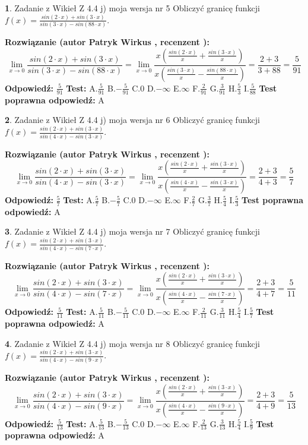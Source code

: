 \documentclass[12pt, a4paper]{article}
\theoremstyle{definition} %
\newtheorem{zad}{}
\newcommand{\zadStart}[1]{\begin{zad}#1\newline}
\newcommand{\zadStop}{\end{zad}}
\newcommand{\rozwStart}[2]{\noindent \textbf{Rozwiązanie (autor #1 , recenzent #2): }\newline}
\newcommand{\rozwStop}{\newline}
\newcommand{\odpStart}{\noindent \textbf{Odpowiedź:}\newline}
\newcommand{\odpStop}{\newline}
\newcommand{\testStart}{\noindent \textbf{Test:}\newline}
\newcommand{\testStop}{\newline}
\newcommand{\kluczStart}{\noindent \textbf{Test poprawna odpowiedź:}\newline}
\newcommand{\kluczStop}{\newline}
\begin{document}
\zadStart{Zadanie z Wikieł Z 4.4 j) moja wersja nr 5}
Obliczyć granicę funkcji $f(x)=\frac{sin(2\cdot x) +sin(3\cdot x)}{sin(3\cdot x) -sin(88\cdot x)}$.
\zadStop
\rozwStart{Patryk Wirkus}{}
$$\lim\limits_{x\to 0}\frac{sin(2\cdot x) +sin(3\cdot x)}{sin(3\cdot x) -sin(88\cdot x)}=\lim\limits_{x\to 0}\frac{x(\frac{sin(2\cdot x)}{x}+\frac{sin(3\cdot x)}{x})}{x(\frac{sin(3\cdot x)}{x}-\frac{sin(88\cdot x)}{x})}=\frac{2+3}{3+88} = \frac{5}{91}$$
\rozwStop
\odpStart
$\frac{5}{91}$
\odpStop
\testStart
A.$\frac{5}{91}$
B.$-\frac{5}{91}$
C.$0$
D.$-\infty$
E.$\infty$
F.$\frac{2}{91}$
G.$\frac{3}{91}$
H.$\frac{5}{3}$
I.$\frac{5}{88}$
\testStop
\kluczStart
A
\kluczStop



\zadStart{Zadanie z Wikieł Z 4.4 j) moja wersja nr 6}
Obliczyć granicę funkcji $f(x)=\frac{sin(2\cdot x) +sin(3\cdot x)}{sin(4\cdot x) -sin(3\cdot x)}$.
\zadStop
\rozwStart{Patryk Wirkus}{}
$$\lim\limits_{x\to 0}\frac{sin(2\cdot x) +sin(3\cdot x)}{sin(4\cdot x) -sin(3\cdot x)}=\lim\limits_{x\to 0}\frac{x(\frac{sin(2\cdot x)}{x}+\frac{sin(3\cdot x)}{x})}{x(\frac{sin(4\cdot x)}{x}-\frac{sin(3\cdot x)}{x})}=\frac{2+3}{4+3} = \frac{5}{7}$$
\rozwStop
\odpStart
$\frac{5}{7}$
\odpStop
\testStart
A.$\frac{5}{7}$
B.$-\frac{5}{7}$
C.$0$
D.$-\infty$
E.$\infty$
F.$\frac{2}{7}$
G.$\frac{3}{7}$
H.$\frac{5}{4}$
I.$\frac{5}{3}$
\testStop
\kluczStart
A
\kluczStop



\zadStart{Zadanie z Wikieł Z 4.4 j) moja wersja nr 7}
Obliczyć granicę funkcji $f(x)=\frac{sin(2\cdot x) +sin(3\cdot x)}{sin(4\cdot x) -sin(7\cdot x)}$.
\zadStop
\rozwStart{Patryk Wirkus}{}
$$\lim\limits_{x\to 0}\frac{sin(2\cdot x) +sin(3\cdot x)}{sin(4\cdot x) -sin(7\cdot x)}=\lim\limits_{x\to 0}\frac{x(\frac{sin(2\cdot x)}{x}+\frac{sin(3\cdot x)}{x})}{x(\frac{sin(4\cdot x)}{x}-\frac{sin(7\cdot x)}{x})}=\frac{2+3}{4+7} = \frac{5}{11}$$
\rozwStop
\odpStart
$\frac{5}{11}$
\odpStop
\testStart
A.$\frac{5}{11}$
B.$-\frac{5}{11}$
C.$0$
D.$-\infty$
E.$\infty$
F.$\frac{2}{11}$
G.$\frac{3}{11}$
H.$\frac{5}{4}$
I.$\frac{5}{7}$
\testStop
\kluczStart
A
\kluczStop



\zadStart{Zadanie z Wikieł Z 4.4 j) moja wersja nr 8}
Obliczyć granicę funkcji $f(x)=\frac{sin(2\cdot x) +sin(3\cdot x)}{sin(4\cdot x) -sin(9\cdot x)}$.
\zadStop
\rozwStart{Patryk Wirkus}{}
$$\lim\limits_{x\to 0}\frac{sin(2\cdot x) +sin(3\cdot x)}{sin(4\cdot x) -sin(9\cdot x)}=\lim\limits_{x\to 0}\frac{x(\frac{sin(2\cdot x)}{x}+\frac{sin(3\cdot x)}{x})}{x(\frac{sin(4\cdot x)}{x}-\frac{sin(9\cdot x)}{x})}=\frac{2+3}{4+9} = \frac{5}{13}$$
\rozwStop
\odpStart
$\frac{5}{13}$
\odpStop
\testStart
A.$\frac{5}{13}$
B.$-\frac{5}{13}$
C.$0$
D.$-\infty$
E.$\infty$
F.$\frac{2}{13}$
G.$\frac{3}{13}$
H.$\frac{5}{4}$
I.$\frac{5}{9}$
\testStop
\kluczStart
A
\kluczStop
\end{document}
